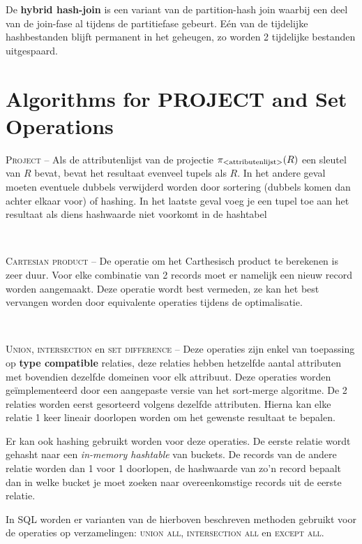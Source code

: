 De \textbf{hybrid hash-join} is een variant van de partition-hash join waarbij een deel van de join-fase al tijdens de partitiefase gebeurt. E\'en van de tijdelijke hashbestanden blijft permanent in het geheugen, zo worden 2 tijdelijke bestanden uitgespaard.



\section{Algorithms for PROJECT and Set Operations}
\textsc{Project} -- Als de attributenlijst van de projectie $\pi_\text{{\textless}attributenlijst{\textgreater}}(R)$ een sleutel van $R$ bevat, bevat het resultaat evenveel tupels als $R$. In het andere geval moeten eventuele dubbels verwijderd worden door sortering (dubbels komen dan achter elkaar voor) of hashing. In het laatste geval voeg je een tupel toe aan het resultaat als diens hashwaarde niet voorkomt in de hashtabel

~

\noindent \textsc{Cartesian product} -- De operatie om het Carthesisch product te berekenen is zeer duur. Voor elke combinatie van 2 records moet er namelijk een nieuw record worden aangemaakt. Deze operatie wordt best vermeden, ze kan het best vervangen worden door equivalente operaties tijdens de optimalisatie.

~

\noindent \textsc{Union}, \textsc{intersection} en \textsc{set difference} -- Deze operaties zijn enkel van toepassing op \textbf{type compatible} relaties, deze relaties hebben hetzelfde aantal attributen met bovendien dezelfde domeinen voor elk attribuut. Deze operaties worden ge\"implementeerd door een aangepaste versie van het sort-merge algoritme. De 2 relaties worden eerst gesorteerd volgens dezelfde attributen. Hierna kan elke relatie 1 keer lineair doorlopen worden om het gewenste resultaat te bepalen.

Er kan ook hashing gebruikt worden voor deze operaties. De eerste relatie wordt gehasht naar een \textit{in-memory hashtable} van buckets. De records van de andere relatie worden dan 1 voor 1 doorlopen, de hashwaarde van zo'n record bepaalt dan in welke bucket je moet zoeken naar overeenkomstige records uit de eerste relatie.

In SQL worden er varianten van de hierboven beschreven methoden gebruikt voor de operaties op verzamelingen: \textsc{union all}, \textsc{intersection all} en \textsc{except all}.




